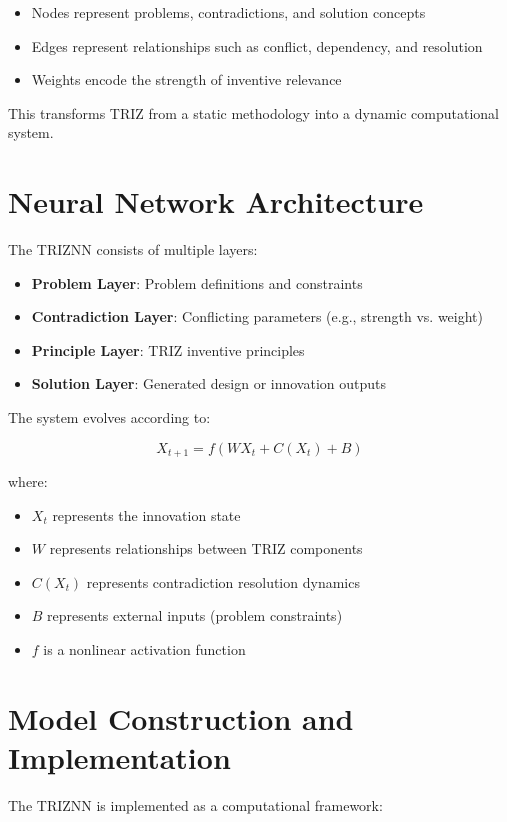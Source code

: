 \documentclass[12pt]{article}
\begin{document}
\begin{itemize}
\item Nodes represent problems, contradictions, and solution concepts
\item Edges represent relationships such as conflict, dependency, and resolution
\item Weights encode the strength of inventive relevance
\end{itemize}

This transforms TRIZ from a static methodology into a dynamic computational system.

\section{Neural Network Architecture}

The TRIZNN consists of multiple layers:

\begin{itemize}
\item \textbf{Problem Layer}: Problem definitions and constraints
\item \textbf{Contradiction Layer}: Conflicting parameters (e.g., strength vs. weight)
\item \textbf{Principle Layer}: TRIZ inventive principles
\item \textbf{Solution Layer}: Generated design or innovation outputs
\end{itemize}

The system evolves according to:

\[
X_{t+1} = f(WX_t + C(X_t) + B)
\]

where:
\begin{itemize}
\item $X_t$ represents the innovation state
\item $W$ represents relationships between TRIZ components
\item $C(X_t)$ represents contradiction resolution dynamics
\item $B$ represents external inputs (problem constraints)
\item $f$ is a nonlinear activation function
\end{itemize}

\section{Model Construction and Implementation}

The TRIZNN is implemented as a computational framework:
\end{document}
